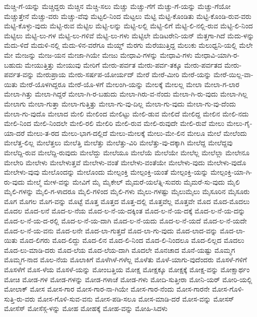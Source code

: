 {ಮೆಚ್ಚಿ-ಗೆ-ಯನ್ನು
ಮೆಚ್ಚಿದ್ದರು
ಮೆಚ್ಚಿನ
ಮೆಚ್ಚಿ-ಸಲು
ಮೆಚ್ಚು
ಮೆಚ್ಚು-ಗೆಗೆ
ಮೆಚ್ಚು-ಗೆ-ಯನ್ನು
ಮೆಚ್ಚು-ಗೆಯೋ
ಮೆಚ್ಚುತ್ತೇನೆ
ಮೆಚ್ಚು-ವರು
ಮೆಚ್ಚು-ವೆವು
ಮೆಟ್ಟಲಿ-ನಿಂದ
ಮೆಟ್ಟಲು
ಮೆಟ್ಟಿ
ಮೆಟ್ಟಿ-ಕೊಂಡಿತು
ಮೆಟ್ಟಿ-ಕೊಂಡಿ-ರುವ-ವರು
ಮೆಟ್ಟಿ-ಕೊಳ್ಳು-ವುದು
ಮೆಟ್ಟಿ-ರುವ
ಮೆಟ್ಟಿಲ
ಮೆಟ್ಟಿ-ಲನ್ನು
ಮೆಟ್ಟಿ-ಲಲ್ಲಿ
ಮೆಟ್ಟಿ-ಲಿಗೆ
ಮೆಟ್ಟಿ-ಲಿ-ನಲ್ಲಿ-ರುವ
ಮೆಟ್ಟಿ-ಲಿ-ನಿಂದ
ಮೆಟ್ಟಿಲು
ಮೆಟ್ಟಿ-ಲು-ಗಳ
ಮೆಟ್ಟಿ-ಲು-ಗಳಿವೆ
ಮೆಟ್ಟಿ-ಲು-ಗಳು
ಮೆಟ್ಟಿಲೇ
ಮೆಡಿಟರೇನಿ-ಯನ್
ಮೆತ್ತಗಾ-ಗಿದೆ
ಮೆದು-ಳನ್ನು
ಮೆದು-ಳಿದೆ
ಮೆದುಳಿ-ನಲ್ಲಿ
ಮೆದು-ಳಿನ-ವರೆಗೂ
ಮೆಯ್ಡ್
ಮೆರಗು
ಮೆರೆಯುತ್ತಿದ್ದ
ಮೆಲುಕು
ಮೆಲುಧ್ವನಿ-ಯಲ್ಲಿ
ಮೆಲೇ
ಮೇ
ಮೇಜನ್ನು
ಮೇಜ-ಯನ
ಮೇಜಾ-ಗಿಯೇ
ಮೇಜು
ಮೇಧಾವಿ-ಗಳನ್ನು
ಮೇಧಾವಿ-ಗಳು
ಮೇಧಾವಿ-ಯಾಗಿ-ರ-ಬಹುದು
ಮೇಯುತ್ತಿತ್ತು
ಮೇಯುವು
ಮೇರಿಗೆ
ಮೇರು-ಪರ್ವತ
ಮೇರು-ಪರ್ವ-ತಕ್ಕೂ
ಮೇರು-ಪರ್ವತದ
ಮೇರು-ಪರ್ವತ-ವನ್ನು
ಮೇರುಪ್ರಾಯ
ಮೇರು-ಸರ್ಷಪ-ಯೋರ್ಯದ್
ಮೇರೆ
ಮೇರೆ-ಮೀರಿ
ಮೇರೆ-ಯನ್ನು
ಮೇರೆ-ಯಿಲ್ಲ-ವಾ-ಯಿತು
ಮೇರೆ-ಯೊಳಗಿದ್ದರೂ
ಮೇರೆ-ಯೊ-ಳಗೆ
ಮೇಲಂಗಿ-ಯನ್ನು
ಮೇಲಕ್ಕೆ
ಮೇಲಲ್ಲ
ಮೇಲಾ
ಮೇಲಾ-ಗ-ಲಾರ
ಮೇಲಾ-ಗಿತ್ತು
ಮೇಲಾ-ಗಿದ್ದರೆ
ಮೇಲಾ-ಗಿ-ರ-ಬಹುದು
ಮೇಲಾ-ಗಿರು-ವ-ನೆಂದು
ಮೇಲಾ-ಗಿ-ರು-ವುದು
ಮೇಲಾ-ಗಿಲ್ಲ
ಮೇಲಾಗು
ಮೇಲಾ-ಗುತ್ತಾ
ಮೇಲಾ-ಗುತ್ತಿತ್ತು
ಮೇಲಾ-ಗು-ವು-ದಿಲ್ಲ
ಮೇಲಾ-ಗು-ವುದು
ಮೇಲಾ-ಗು-ವು-ದೆಂದು
ಮೇಲಾ-ಗು-ವುದೊ
ಮೇಲಾದ
ಮೇಲಿ
ಮೇಲಿಂದ
ಮೇಲಿಟ್ಟು
ಮೇಲಿ-ಡುವ
ಮೇಲಿದೆ
ಮೇಲಿದ್ದ
ಮೇಲಿನ
ಮೇಲಿ-ನದು
ಮೇಲಿ-ನಿಂದ
ಮೇಲಿ-ನಿಂದಲೇ
ಮೇಲಿ-ರಲಿ
ಮೇಲಿರಿ
ಮೇಲಿ-ರುವ
ಮೇಲಿ-ರುವುದೇ
ಮೇಲಿ-ರುವೆ
ಮೇಲು
ಮೇಲು-ಗೈ-ಯಾ-ದರೆ
ಮೇಲು-ತ-ರದ
ಮೇಲು-ಭಾಗ-ದಲ್ಲಿದೆ
ಮೇಲು-ಮೇಲಕ್ಕೆ
ಮೇಲು-ಮೇ-ಲಿನ
ಮೇಲೂ
ಮೇಲೆ
ಮೇಲೆಂದು
ಮೇಲೆತ್ತ-ಲಿಲ್ಲ
ಮೇಲೆತ್ತಲು
ಮೇಲೆತ್ತಿ
ಮೇಲೆತ್ತು
ಮೇಲೆತ್ತು-ವಿರಿ
ಮೇಲೆತ್ತು-ವು-ದಕ್ಕಾಗಿ
ಮೇಲೆದ್ದ
ಮೇಲೆದ್ದವು
ಮೇಲೆದ್ದಿ-ರುವ
ಮೇಲೆದ್ದಿ-ರುವುದು
ಮೇಲೆದ್ದು
ಮೇಲೆಯೂ
ಮೇಲೆಯೆ
ಮೇಲೆಯೇ
ಮೇಲೆಲ್ಲ
ಮೇಲೆಲ್ಲಾ
ಮೇಲೇನೂ
ಮೇಲೇರಿ
ಮೇಲೇಳು
ಮೇಲೇಳುತ್ತವೆ
ಮೇಲೇಳು-ವಂತೆ
ಮೇಲೇಳು-ವಂತೆಯೇ
ಮೇಲೇಳು-ವುದು
ಮೇಲೇಳು-ವುದೊ
ಮೇಲೇಳು-ವುವು
ಮೇಲೊಂದನ್ನು
ಮೇಲೊಂದು
ಮೇಲ್ಪಂಕ್ತಿ
ಮೇಲ್ಪಂಕ್ತಿ-ಯಂತೆ
ಮೇಲ್ಪಂಕ್ತಿ-ಯನ್ನು
ಮೇಲ್ಪಂಕ್ತಿ-ಯಾ-ಗಿ-ರು-ವುದು
ಮೇಲ್ಮೆ
ಮೇಳ-ವನ್ನು
ಮೇವಿಗೆ
ಮೈ
ಮೈಕೇಲ್
ಮೈಮರೆ-ಯಲೆತ್ನಿ-ಸುವರು
ಮೈಮರೆ-ಸು-ವುದು
ಮೈಲಿ
ಮೈಲಿ-ಗಳನ್ನು
ಮೈಲಿ-ಗ-ಳಾದರೂ
ಮೈಲಿ-ಗಳಿಂದ
ಮೈಲಿ-ಗಳು
ಮೈಲು-ಗಳಷ್ಟು
ಮೈಲುಮೈಲು
ಮೈಸೂರಿನ
ಮೈಸೂರು
ಮೊಗ
ಮೊಗಲ
ಮೊಗ-ವನ್ನು
ಮೊಟ್ಟೆ
ಮೊತ್ತ
ಮೊತ್ತದ
ಮೊತ್ತ-ದಲ್ಲಿ
ಮೊತ್ತವೆಲ್ಲ
ಮೊತ್ತವೇ
ಮೊದ
ಮೊದ-ಮೊದಲು
ಮೊದಲ
ಮೊದ-ಲನೆ
ಮೊದ-ಲ-ನೆಯ
ಮೊದ-ಲ-ನೆ-ಯ-ದಕ್ಕಿಂತ
ಮೊದ-ಲ-ನೆ-ಯ-ದಕ್ಕೆ
ಮೊದ-ಲ-ನೆ-ಯ-ದನ್ನು
ಮೊದ-ಲ-ನೆ-ಯ-ದ-ರಲ್ಲಿ
ಮೊದ-ಲ-ನೆ-ಯ-ದಾಗಿ
ಮೊದ-ಲ-ನೆ-ಯದು
ಮೊದ-ಲ-ನೆ-ಯದೆ
ಮೊದ-ಲ-ನೆ-ಯದೇ
ಮೊದ-ಲ-ನೆ-ಯ-ವನು
ಮೊದ-ಲನೇ
ಮೊದ-ಲಾ-ಗುತ್ತದೆ
ಮೊದ-ಲಾ-ಗು-ವುದು
ಮೊದ-ಲಾದ-ವನ್ನು
ಮೊದ-ಲಾ-ಯಿತು
ಮೊದ-ಲಿಗರು
ಮೊದ-ಲಿದ್ದು
ಮೊದ-ಲಿನ
ಮೊದ-ಲಿ-ನಿಂದ
ಮೊದ-ಲಿ-ನಿಂದಲೂ
ಮೊದ-ಲಿಲ್ಲದ
ಮೊದಲು
ಮೊದ-ಲು-ಮಾಡಿ-ದರು
ಮೊದ-ಲೆಯ
ಮೊದ-ಲೆಯ-ದಾಗಿ
ಮೊದಲೇ
ಮೊನಚಾದ
ಮೊನೆ-ಯಷ್ಟು
ಮೊಮ್ಮಗ
ಮೊಮ್ಮಗ-ನಾದ
ಮೊಲ-ನೆಯ
ಮೊಲಾಕಿಗೆ
ಮೊಳೆಗಿಳೆ-ಗಳೆಲ್ಲ
ಮೊಳೆತು
ಮೊಳೆ-ಯಾಗು-ವುದೆಂದರು
ಮೊಸಳೆ-ಗಳಿಗೆ
ಮೊಸಳೆಗೆ
ಮೊಸ-ಳೆಯ
ಮೊಸಳೆ-ಯನ್ನು
ಮೋಂಬತ್ತಿಯ
ಮೋಕ್ಷ
ಮೋಕ್ಷಕ್ಕೂ
ಮೋಕ್ಷಕ್ಕೆ
ಮೋಕ್ಷ-ವನ್ನು
ಮೋಕ್ಷಾರ್ಥಂ
ಮೋಚಿ
ಮೋಡ-ಗಳ
ಮೋಡ-ಗಳನ್ನು
ಮೋಡ-ಗಳಾಚೆ
ಮೋಡ-ಗಳು
ಮೋದಿ-ಸುತ್ತೀರಾ
ಮೋನಿ-ಯರ್
ಮೋರಿ-ಯಲ್ಲಿ
ಮೋಲಾಕ್
ಮೋಸ
ಮೋಸ-ಗಾರ
ಮೋಸ-ಗಾರ-ನಾ-ಗಿಯೇ
ಮೋಸ-ಗಾರ-ನೆಂದು
ಮೋಸ-ಗಾರನೇ
ಮೋಸ-ಗೊಳಿ-ಸುತ್ತಿ-ರು-ವರು
ಮೋಸ-ಗೊಳಿ-ಸುವ-ವನು
ಮೋಸ-ಪಡಿ-ಸಲೂ
ಮೋಸ-ಮಾಡಿ-ದರೆ
ಮೋಸ-ವನ್ನು
ಮೋಸಸ್
ಮೋಸೆಸ್
ಮೋಸೆಸ್ಗ-ಳನ್ನು
ಮೋಹ
ಮೋಹಕ್ಕೆ
ಮೋಹ-ವನ್ನು
ಮೋಹಿ-ಸಿದಳು
}
